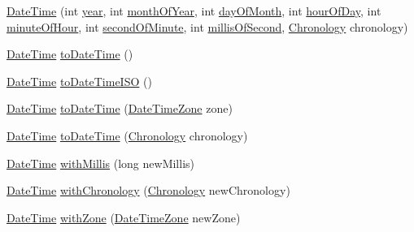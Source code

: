 \begin{DoxyCompactItemize}
\item 
\hyperlink{classorg_1_1joda_1_1time_1_1_date_time_a4383047ebd9e369e7e0394e5d072c64e}{Date\-Time} (int \hyperlink{classorg_1_1joda_1_1time_1_1_date_time_a2fad630c40bee720a815fb4e2a06f133}{year}, int \hyperlink{classorg_1_1joda_1_1time_1_1_date_time_a9119fa14bbe721475778ba261337aa0e}{month\-Of\-Year}, int \hyperlink{classorg_1_1joda_1_1time_1_1_date_time_ae2edf04c8cc742fdfcd838acf53f8751}{day\-Of\-Month}, int \hyperlink{classorg_1_1joda_1_1time_1_1_date_time_ad4d63b2e220315cf5eb57d3960f65ba5}{hour\-Of\-Day}, int \hyperlink{classorg_1_1joda_1_1time_1_1_date_time_ab9fa72f78065c0a7abb9819505d66ee6}{minute\-Of\-Hour}, int \hyperlink{classorg_1_1joda_1_1time_1_1_date_time_a9dee7bbe22d6f87a9dedc9017be29550}{second\-Of\-Minute}, int \hyperlink{classorg_1_1joda_1_1time_1_1_date_time_adebe1a924958e8d4e127d5b278887eee}{millis\-Of\-Second}, \hyperlink{classorg_1_1joda_1_1time_1_1_chronology}{Chronology} chronology)
\item 
\hyperlink{classorg_1_1joda_1_1time_1_1_date_time}{Date\-Time} \hyperlink{classorg_1_1joda_1_1time_1_1_date_time_a3e381186eaf277d937604d384fca938f}{to\-Date\-Time} ()
\item 
\hyperlink{classorg_1_1joda_1_1time_1_1_date_time}{Date\-Time} \hyperlink{classorg_1_1joda_1_1time_1_1_date_time_a63e51009d6c4763a38bdd04f2ea83f1a}{to\-Date\-Time\-I\-S\-O} ()
\item 
\hyperlink{classorg_1_1joda_1_1time_1_1_date_time}{Date\-Time} \hyperlink{classorg_1_1joda_1_1time_1_1_date_time_abb7a00da0dbf0e3503decf0654b6422f}{to\-Date\-Time} (\hyperlink{classorg_1_1joda_1_1time_1_1_date_time_zone}{Date\-Time\-Zone} zone)
\item 
\hyperlink{classorg_1_1joda_1_1time_1_1_date_time}{Date\-Time} \hyperlink{classorg_1_1joda_1_1time_1_1_date_time_a08a94551aea46eb181e07e242b48c196}{to\-Date\-Time} (\hyperlink{classorg_1_1joda_1_1time_1_1_chronology}{Chronology} chronology)
\item 
\hyperlink{classorg_1_1joda_1_1time_1_1_date_time}{Date\-Time} \hyperlink{classorg_1_1joda_1_1time_1_1_date_time_ad7ac9f674c17a0d0ce5bc7bcdfe6674d}{with\-Millis} (long new\-Millis)
\item 
\hyperlink{classorg_1_1joda_1_1time_1_1_date_time}{Date\-Time} \hyperlink{classorg_1_1joda_1_1time_1_1_date_time_a47f6be8c79cd10b9f62eac347910cf40}{with\-Chronology} (\hyperlink{classorg_1_1joda_1_1time_1_1_chronology}{Chronology} new\-Chronology)
\item 
\hyperlink{classorg_1_1joda_1_1time_1_1_date_time}{Date\-Time} \hyperlink{classorg_1_1joda_1_1time_1_1_date_time_ac7f69f322880cb766184136fcae98860}{with\-Zone} (\hyperlink{classorg_1_1joda_1_1time_1_1_date_time_zone}{Date\-Time\-Zone} new\-Zone)

\end{DoxyCompactItemize}
